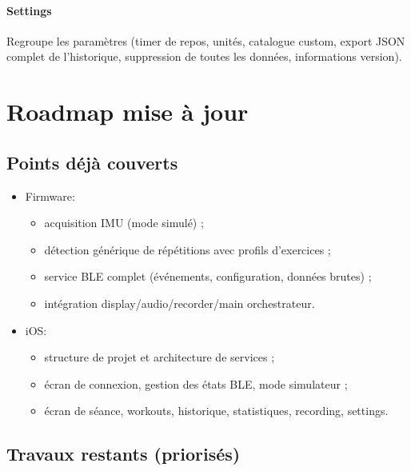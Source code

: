 \documentclass[a4paper,11pt]{article}
\begin{document}
\paragraph{Settings}
Regroupe les paramètres (timer de repos, unités, catalogue custom, export JSON complet de l'historique, suppression de toutes les données, informations version).

\section{Roadmap mise à jour}

\subsection{Points déjà couverts}

\begin{itemize}[nosep]
  \item Firmware:
  \begin{itemize}
    \item acquisition IMU (mode simulé) ;
    \item détection générique de répétitions avec profils d'exercices ;
    \item service BLE complet (événements, configuration, données brutes) ;
    \item intégration display/audio/recorder/main orchestrateur.
  \end{itemize}
  \item iOS:
  \begin{itemize}
    \item structure de projet et architecture de services ;
    \item écran de connexion, gestion des états BLE, mode simulateur ;
    \item écran de séance, workouts, historique, statistiques, recording, settings.
  \end{itemize}
\end{itemize}

\subsection{Travaux restants (priorisés)}
\end{document}
